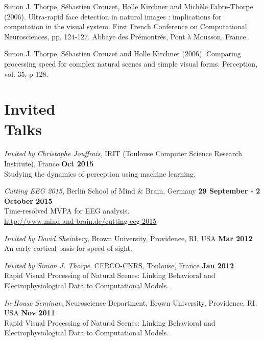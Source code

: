 \documentclass[margin,line]{resume}
\begin{document}
\begin{resume}
\vspace{-2mm} Simon J. Thorpe, Sébastien Crouzet, Holle Kirchner and Michèle Fabre-Thorpe (2006). Ultra-rapid face detection in natural images : implications for computation in the visual system. First French Conference on Computational Neurosciences, pp. 124-127. Abbaye des Prémontrés, Pont à Mousson, France.

\vspace{-2mm} Simon J. Thorpe, Sébastien Crouzet and Holle Kirchner (2006). Comparing processing speed for complex natural scenes and simple visual forms. Perception, vol. 35, p 128.

\normalsize


    \section{\mysidestyle Invited\\Talks}
    
\footnotesize %

\textit{Invited by Christophe Jouffrais}, IRIT (Toulouse Computer Science Research Institute), France \hfill \textbf{Oct 2015}\\
Studying the dynamics of perception using machine learning.

\textit{Cutting EEG 2015}, Berlin School of Mind \& Brain, Germany \hfill \textbf{29 September - 2 October 2015}\\
Time-resolved MVPA for EEG analysis. \\
\url{http://www.mind-and-brain.de/cutting-eeg-2015}
	
\textit{Invited by David Sheinberg}, Brown University, Providence, RI, USA \hfill \textbf{Mar 2012}\\
An early cortical basis for speed of sight. 

\vspace{-2mm} 
\textit{Invited by Simon J. Thorpe}, CERCO-CNRS, Toulouse, France \hfill \textbf{Jan 2012}\\
Rapid Visual Processing of Natural Scenes: Linking Behavioral and Electrophysiological Data to Computational Models.

\vspace{-2mm} 
\textit{In-House Seminar}, Neuroscience Department, Brown University, Providence, RI, USA \hfill \textbf{Nov 2011}\\
Rapid Visual Processing of Natural Scenes: Linking Behavioral and Electrophysiological Data to Computational Models.


\end{resume}
\end{document}
